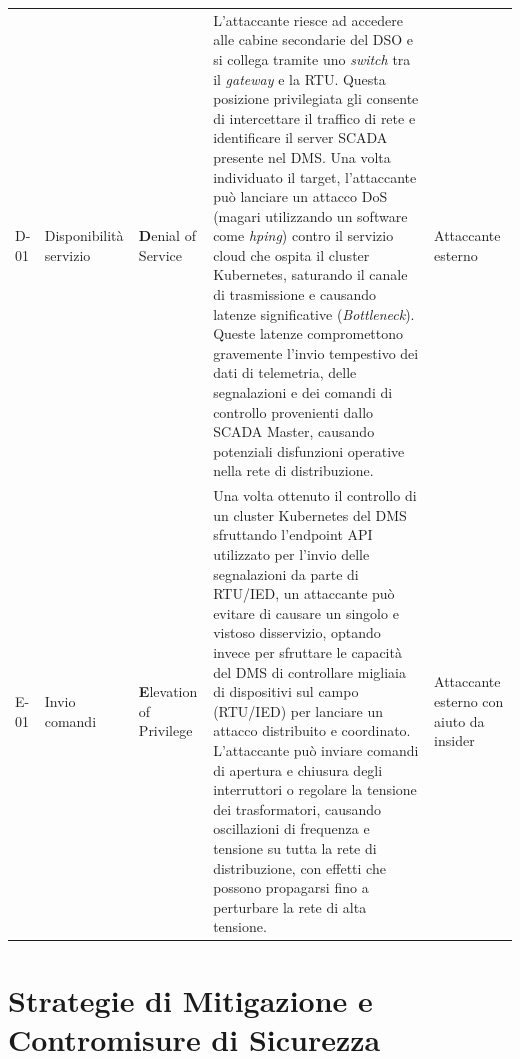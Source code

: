\begin{longtable}{p{1.5cm}p{2cm}p{2cm}p{7.5cm}p{2cm}}
    D-01 & Disponibilità servizio & \textbf{D}enial of Service & L'attaccante riesce ad accedere alle cabine secondarie del DSO e si collega tramite uno \textit{switch} tra il \textit{gateway} e la RTU. Questa posizione privilegiata gli consente di intercettare il traffico di rete e identificare il server SCADA presente nel DMS. Una volta individuato il target, l'attaccante può lanciare un attacco DoS (magari utilizzando un software come \textit{hping}) contro il servizio cloud che ospita il cluster Kubernetes, saturando il canale di trasmissione e causando latenze significative (\textit{Bottleneck}). Queste latenze compromettono gravemente l'invio tempestivo dei dati di telemetria, delle segnalazioni e dei comandi di controllo provenienti dallo SCADA Master, causando potenziali disfunzioni operative nella rete di distribuzione. \cite{threat-sotto-stazioni-paper} & Attaccante esterno\\ 
    

    E-01 & Invio comandi & \textbf{E}levation of Privilege & Una volta ottenuto il controllo di un cluster Kubernetes del DMS sfruttando l'endpoint API utilizzato per l'invio delle segnalazioni da parte di RTU/IED, un attaccante può evitare di causare un singolo e vistoso disservizio, optando invece per sfruttare le capacità del DMS di controllare migliaia di dispositivi sul campo (RTU/IED) per lanciare un attacco distribuito e coordinato. L'attaccante può inviare comandi di apertura e chiusura degli interruttori o regolare la tensione dei trasformatori, causando oscillazioni di frequenza e tensione su tutta la rete di distribuzione, con effetti che possono propagarsi fino a perturbare la rete di alta tensione. & Attaccante esterno con aiuto da insider\\
   

\hline


\end{longtable}


\newpage

\section{Strategie di Mitigazione e Contromisure di Sicurezza}


